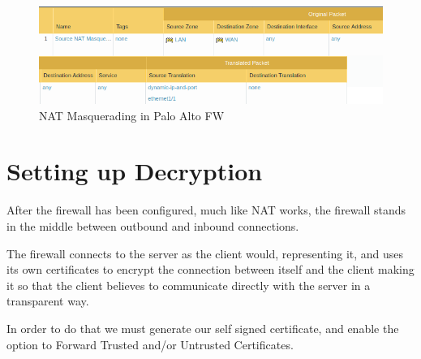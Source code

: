 \documentclass[status=normal,cover=tesi,language=en]{gmeepd}
\begin{document}
\begin{figure}[!hb]
 \centering
 \includegraphics[width=13cm]{img/NAT_Masquerade.png}
 \caption{NAT Masquerading in Palo Alto FW}
 \label{NAT Masquerade}
\end{figure}


\pagebreak

\section{Setting up Decryption}

After the firewall has been configured, much like NAT works, the firewall stands in the middle between outbound and inbound connections.

The firewall connects to the server as the client would, representing it, and uses its own certificates to encrypt the connection between itself and the client making it so that the client believes to communicate directly with the server in a transparent way.

In order to do that we must generate our self signed certificate, and enable the option to Forward Trusted and/or Untrusted Certificates.
\end{document}
